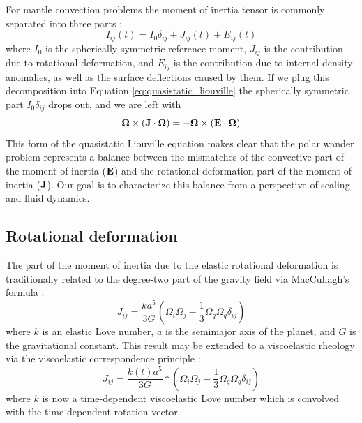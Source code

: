 \documentclass[extra,mreferee]{gji}
\begin{document}
For mantle convection problems the moment of inertia tensor is commonly separated into three parts \citep{ricard1993polar}:
\begin{equation}
I_{ij}(t) = I_0 \delta_{ij} + J_{ij}(t) + E_{ij}(t)
\label{eq:separation}
\end{equation}
where $I_0$ is the spherically symmetric reference moment, $J_{ij}$ is the contribution due to rotational deformation, and $E_{ij}$ is the contribution due to internal density anomalies, as well as the surface deflections caused by them.
If we plug this decomposition into Equation \eqref{eq:quasistatic_liouville} the spherically symmetric part $I_0 \delta_{ij}$ drops out, and we are left with
\begin{equation}
{\bf \Omega} \times ({\bf J} \cdot {\bf \Omega}) = -{\bf \Omega } \times ( {\bf E} \cdot {\bf \Omega} )
\label{eq:disequilibrium}
\end{equation}
This form of the quasistatic Liouville equation makes clear that the polar wander problem represents a balance between the mismatches of the convective part of the moment of inertia ($\bf E$) and the rotational deformation part of the moment of inertia ($\bf J$).
Our goal is to characterize this balance from a perspective of scaling and fluid dynamics.

\subsection{Rotational deformation}

The part of the moment of inertia due to the elastic rotational deformation is traditionally related to the degree-two part of the gravity field via MacCullagh's formula \citep{munk1960rotation}:
\begin{equation}
J_{ij} = \frac{k a^5}{3 G} \left( \Omega_i \Omega_j - \frac{1}{3} \Omega_q \Omega_q \delta_{ij} \right)
\label{eq:elastic_deformation}
\end{equation}
where $k$ is an elastic Love number, $a$ is the semimajor axis of the planet, and $G$ is the gravitational constant.
This result may be extended to a viscoelastic rheology via the viscoelastic correspondence principle \citep[e.g.][]{peltier1974impulse}:
\begin{equation}
J_{ij} = \frac{k(t) a^5}{3 G} * \left( \Omega_i \Omega_j - \frac{1}{3} \Omega_q \Omega_q \delta_{ij} \right)
\label{eq:viscoelastic_deformation}
\end{equation}
where $k$ is now a time-dependent viscoelastic Love number which is convolved with the time-dependent rotation vector.
\end{document}
